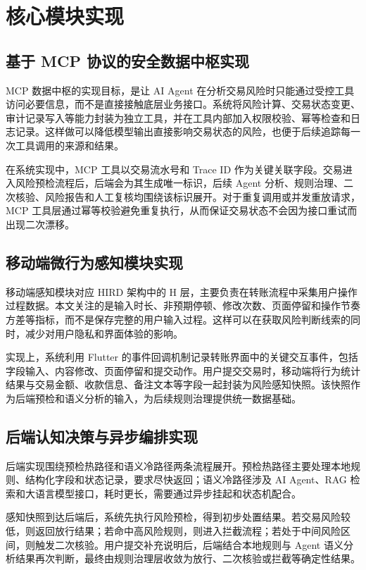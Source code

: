\documentclass{xduugthesis}
\begin{document}
\section{核心模块实现}

\subsection{基于 MCP 协议的安全数据中枢实现}

MCP 数据中枢的实现目标，是让 AI Agent 在分析交易风险时只能通过受控工具访问必要信息，而不是直接接触底层业务接口。系统将风险计算、交易状态变更、审计记录写入等能力封装为独立工具，并在工具内部加入权限校验、幂等检查和日志记录。这样做可以降低模型输出直接影响交易状态的风险，也便于后续追踪每一次工具调用的来源和结果。

在系统实现中，MCP 工具以交易流水号和 Trace ID 作为关键关联字段。交易进入风险预检流程后，后端会为其生成唯一标识，后续 Agent 分析、规则治理、二次核验、风险报告和人工复核均围绕该标识展开。对于重复调用或并发重放请求，MCP 工具层通过幂等校验避免重复执行，从而保证交易状态不会因为接口重试而出现二次漂移。

\subsection{移动端微行为感知模块实现}

移动端感知模块对应 HIRD 架构中的 H 层，主要负责在转账流程中采集用户操作过程数据。本文关注的是输入时长、非预期停顿、修改次数、页面停留和操作节奏方差等指标，而不是保存完整的用户输入过程。这样可以在获取风险判断线索的同时，减少对用户隐私和界面体验的影响。

实现上，系统利用 Flutter 的事件回调机制记录转账界面中的关键交互事件，包括字段输入、内容修改、页面停留和提交动作。用户提交交易时，移动端将行为统计结果与交易金额、收款信息、备注文本等字段一起封装为风险感知快照。该快照作为后端预检和语义分析的输入，为后续规则治理提供统一数据基础。

\subsection{后端认知决策与异步编排实现}

后端实现围绕预检热路径和语义冷路径两条流程展开。预检热路径主要处理本地规则、结构化字段和状态记录，要求尽快返回；语义冷路径涉及 AI Agent、RAG 检索和大语言模型接口，耗时更长，需要通过异步挂起和状态机配合。

感知快照到达后端后，系统先执行风险预检，得到初步处置结果。若交易风险较低，则返回放行结果；若命中高风险规则，则进入拦截流程；若处于中间风险区间，则触发二次核验。用户提交补充说明后，后端结合本地规则与 Agent 语义分析结果再次判断，最终由规则治理层收敛为放行、二次核验或拦截等确定性结果。
\end{document}

